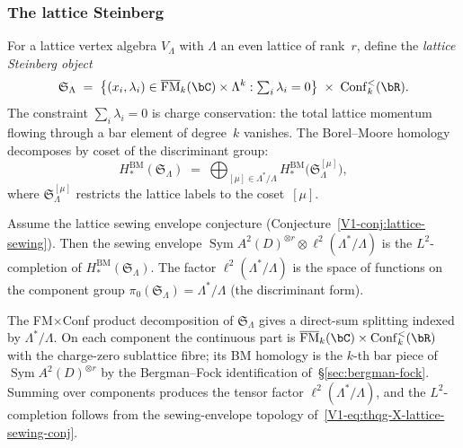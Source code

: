 \subsubsection{The lattice Steinberg}
%
%

\providecommand{\Steinberg}{\mathfrak{S}}

\begin{construction}%
For a lattice vertex algebra $V_\Lambda$ with $\Lambda$ an
even lattice of rank~$r$, define the \emph{lattice Steinberg
object}
\begin{equation}%
\Steinberg_\Lambda
\;=\;
\bigl\{(x_i, \lambda_i)
 \in \FM_k(\bC) \times \Lambda^k
 : \textstyle\sum_i \lambda_i = 0\bigr\}
\;\times\;
\Conf_k^{<}(\bR).
\end{equation}
The constraint $\sum_i \lambda_i = 0$ is charge conservation:
the total lattice momentum flowing through a bar element of
degree~$k$ vanishes. The Borel--Moore homology decomposes by
coset of the discriminant group:
\begin{equation}%
H_*^{\mathrm{BM}}(\Steinberg_\Lambda)
\;=\;
\bigoplus_{[\mu] \in \Lambda^*/\Lambda}
H_*^{\mathrm{BM}}\!\bigl(\Steinberg_\Lambda^{[\mu]}\bigr),
\end{equation}
where $\Steinberg_\Lambda^{[\mu]}$ restricts the lattice
labels to the coset~$[\mu]$.
\end{construction}

\begin{conjecture}%
Assume the lattice sewing envelope conjecture
\textup{(}Conjecture~\textup{\ref{V1-conj:lattice-sewing})}.
Then the sewing envelope
$\operatorname{Sym} A^2(D)^{\otimes r}
\otimes \ell^2(\Lambda^*/\Lambda)$
is the $L^2$-completion of
$H_*^{\mathrm{BM}}(\Steinberg_\Lambda)$.
The factor $\ell^2(\Lambda^*/\Lambda)$ is the space of
functions on the component group
$\pi_0(\Steinberg_\Lambda) = \Lambda^*/\Lambda$
(the discriminant form).
\end{conjecture}

\begin{remark}[Evidence]
The FM$\times$Conf product decomposition of
$\Steinberg_\Lambda$ gives a direct-sum splitting indexed by
$\Lambda^*/\Lambda$. On each component the continuous part is
$\FM_k(\bC) \times \Conf_k^{<}(\bR)$ with the charge-zero
sublattice fibre; its BM homology is the $k$-th bar piece of
$\operatorname{Sym} A^2(D)^{\otimes r}$ by the Bergman--Fock
identification of~\S\ref{sec:bergman-fock}. Summing over
components produces the tensor factor
$\ell^2(\Lambda^*/\Lambda)$, and the $L^2$-completion follows
from the sewing-envelope topology
of~\eqref{V1-eq:thqg-X-lattice-sewing-conj}.
\end{remark}

